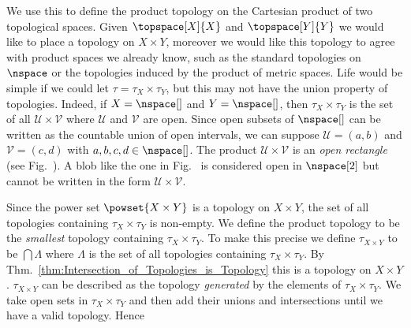 \documentclass{book}                                                           %
\begin{document}
                We use this to define the product topology on the Cartesian
                product of two topological spaces. Given $\topspace[X]{X}$ and
                $\topspace[Y]{Y}$ we would like to place a topology on
                $X\times{Y}$, moreover we would like this topology to agree with
                product spaces we already know, such as the standard topologies
                on $\nspace$ or the topologies induced by the product of metric
                spaces. Life would be simple if we could let
                $\tau=\tau_{X}\times\tau_{Y}$, but this may not have the union
                property of topologies. Indeed, if $X=\nspace[]$ and
                $Y=\nspace[]$, then $\tau_{X}\times\tau_{Y}$ is the set of all
                $\mathcal{U}\times\mathcal{V}$ where $\mathcal{U}$ and
                $\mathcal{V}$ are open. Since open subsets of $\nspace[]$ can be
                written as the countable union of open intervals, we can suppose
                $\mathcal{U}=(a,b)$ and $\mathcal{V}=(c,d)$ with
                $a,b,c,d\in\nspace[]$. The product
                $\mathcal{U}\times\mathcal{V}$ is an \textit{open rectangle}
                (see Fig.~). A blob like the
                one in Fig.~ is considered
                open in $\nspace[2]$ but cannot be written in the form
                $\mathcal{U}\times\mathcal{V}$.
                \par\hfill\par
                Since the power set $\powset{X\times{Y}}$ is a topology on
                $X\times{Y}$, the set of all topologies containing
                $\tau_{X}\times\tau_{Y}$ is non-empty. We define the product
                topology to be the \textit{smallest} topology containing
                $\tau_{X}\times\tau_{Y}$. To make this precise we define
                $\tau_{X\times{Y}}$ to be $\bigcap\Lambda$ where $\Lambda$
                is the set of all topologies containing
                $\tau_{X}\times\tau_{Y}$. By
                Thm.~\ref{thm:Intersection_of_Topologies_is_Topology} this
                is a topology on $X\times{Y}$.%
                $\tau_{X\times{Y}}$ can be described as the topology
                \textit{generated} by the elements of
                $\tau_{X}\times\tau_{Y}$. We take open sets in
                $\tau_{X}\times\tau_{Y}$ and then add their unions and
                intersections until we have a valid topology. Hence
\end{document}
